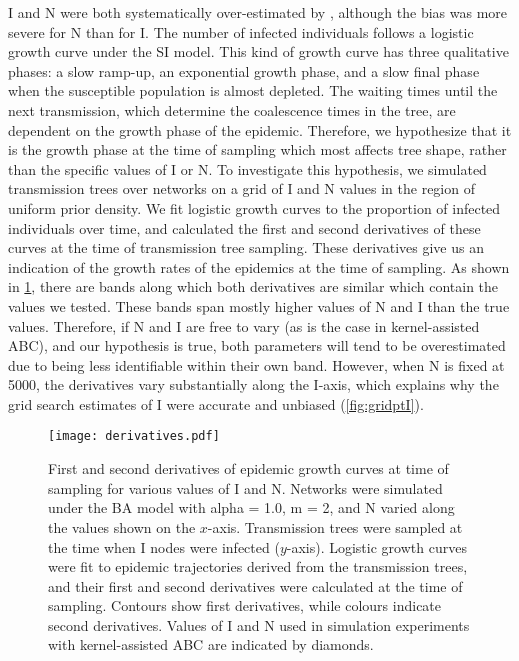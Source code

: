 \gls{I} and \gls{N} were both systematically over-estimated by
, although the bias was more severe for \gls{N} than for
\gls{I}. The number of infected individuals follows a logistic growth curve
under the \gls{SI} model. This kind of growth curve has three qualitative
phases: a slow ramp-up, an exponential growth phase, and a slow final phase
when the susceptible population is almost depleted. The waiting times until the
next transmission, which determine the coalescence times in the tree, are
dependent on the growth phase of the epidemic. Therefore, we hypothesize that
it is the growth phase at the time of sampling which most affects tree shape,
rather than the specific values of \gls{I} or \gls{N}. To investigate this
hypothesis, we simulated transmission trees over networks on a grid of \gls{I}
and \gls{N} values in the region of uniform prior density. We fit logistic
growth curves to the proportion of infected individuals over time, and
calculated the first and second derivatives of these curves at the time of
transmission tree sampling. These derivatives give us an indication of the
growth rates of the epidemics at the time of sampling. As shown in
\cref{fig:derivs}, there are bands along which both derivatives are similar
which contain the values we tested. These bands span mostly higher values of
\gls{N} and \gls{I} than the true values. Therefore, if \gls{N} and \gls{I} are
free to vary (as is the case in kernel-assisted \gls{ABC}), and our hypothesis is true,
both parameters will tend to be overestimated due to being less identifiable
within their own band. However, when \gls{N} is fixed at 5000, the derivatives
vary substantially along the \gls{I}-axis, which explains why the grid search
estimates of \gls{I} were accurate and unbiased (\cref{fig:gridptI}).

\begin{figure}[ht]
  \centering
  \texttt{[image: derivatives.pdf]}
  \caption[
    First and second derivatives of epidemic growth curves at time of sampling
    for various values of $I$ and $N$.
  ]{
    First and second derivatives of epidemic growth curves at time of sampling
    for various values of \gls{I} and \gls{N}. Networks were simulated under
    the \gls{BA} model with \gls{alpha} = 1.0, \gls{m} = 2, and \gls{N} varied 
    along the values shown on the $x$-axis. Transmission trees were sampled at
    the time when \gls{I} nodes were infected ($y$-axis). Logistic growth
    curves were fit to epidemic trajectories derived from the transmission
    trees, and their first and second derivatives were calculated at the time
    of sampling. Contours show first derivatives, while colours indicate second
    derivatives. Values of \gls{I} and \gls{N} used in simulation experiments
    with kernel-assisted \gls{ABC} are indicated by diamonds.
  }
  \label{fig:derivs}
\end{figure}

